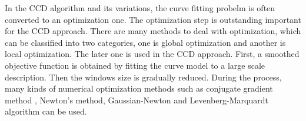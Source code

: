 In the CCD algorithm and its variations, the curve fitting probelm is
often converted to an optimization one. The optimization step is
outstanding important for the CCD approach. There are many methods to
deal with optimization, which can be classified into two
categories, one is global optimization and another is local
optimization\cite{hanek2004fitting}. The later one is used in the CCD
approach. First, a smoothed objective function is obtained by fitting
the curve model to a large scale description. Then the windows size is
gradually reduced. During the process, many kinds of  numerical
optimization  methods such as  conjugate gradient method , Newton's
method, Gaussian-Newton and Levenberg-Marquardt algorithm
\cite{contourpanin2011} can be used.


